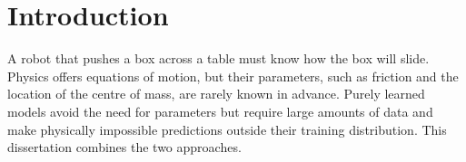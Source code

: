 \chapter{Introduction}
\label{ch:introduction}

A robot that pushes a box across a table must know how the box will slide. Physics offers
equations of motion, but their parameters, such as friction and the location of the centre of
mass, are rarely known in advance. Purely learned models avoid the need for parameters but
require large amounts of data and make physically impossible predictions outside their training
distribution. This dissertation combines the two approaches.
